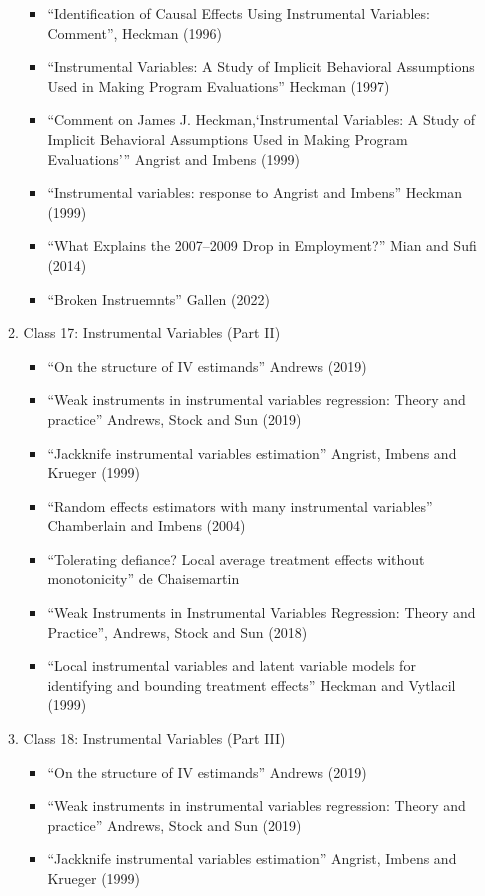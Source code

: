 \documentclass[11pt, a4paper]{article}
\begin{document}
\begin{enumerate}
\begin{enumerate}
\begin{itemize}
    \item ``Identification of Causal Effects Using Instrumental Variables: Comment'', Heckman (1996)
    \item ``Instrumental Variables: A Study of Implicit Behavioral Assumptions Used in Making Program Evaluations'' Heckman (1997)
    \item ``Comment on James J. Heckman,`Instrumental Variables: A Study of Implicit Behavioral Assumptions Used in Making Program Evaluations''' Angrist and Imbens (1999)
    \item ``Instrumental variables: response to Angrist and Imbens'' Heckman (1999)
    \item ``What Explains the 2007–2009 Drop in Employment?'' Mian and Sufi (2014)
    \item ``Broken Instruemnts'' Gallen (2022)
    \end{itemize}
  \item Class 17: Instrumental Variables (Part II)
    \begin{itemize}
    \item ``On the structure of IV estimands'' Andrews (2019)
    \item ``Weak instruments in instrumental variables regression: Theory and practice'' Andrews, Stock and Sun (2019)
    \item ``Jackknife instrumental variables estimation'' Angrist, Imbens and Krueger (1999)
    \item ``Random effects estimators with many instrumental variables'' Chamberlain and Imbens (2004)
    \item ``Tolerating defiance? Local average treatment effects without monotonicity'' de Chaisemartin
    \item ``Weak Instruments in Instrumental Variables Regression: Theory and Practice'', Andrews, Stock and Sun (2018)
    \item ``Local instrumental variables and latent variable models for identifying and bounding treatment effects'' Heckman and Vytlacil (1999)
    \end{itemize}
  \item Class 18: Instrumental Variables (Part III)
    \begin{itemize}
    \item ``On the structure of IV estimands'' Andrews (2019)
    \item ``Weak instruments in instrumental variables regression: Theory and practice'' Andrews, Stock and Sun (2019)
    \item ``Jackknife instrumental variables estimation'' Angrist, Imbens and Krueger (1999)

\end{itemize}
\end{enumerate}
\end{enumerate}
\end{document}
